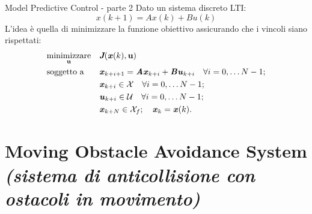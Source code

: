 \documentclass{beamer}
\renewcommand{\vec}[1]{\ensuremath{\boldsymbol{\mathit{#1}}}}
\begin{document}
	\begin{frame}{Model Predictive Control - parte 2}
		Dato un sistema discreto LTI:
		\begin{equation*}
		\label{eqn:MPC_plant_discrete}
		\vec{x}(k+1)=\vec{A}\vec{x}(k)+ \vec{B} \vec{u}(k)
		\end{equation*}
		L'idea è quella di minimizzare la funzione obiettivo assicurando che i vincoli siano rispettati:
		\begin{equation*}
		\label{eqn:MPC_optimization}
		\begin{aligned}
		& \underset{\textbf{u}}{\text{minimizzare}}
		& & {\text{\itshape
				\bfseries J}}(\vec{x}(k), \textbf{u}) \\
		& \text{soggetto a}
		& & \vec{x}_{k+i+1} = \vec{A}\vec{x}_{k+i}+ \vec{B} \vec{u}_{k+i}\quad\forall i=0,\dots N-1;\\
		& & & \vec{x}_{k+i}\in \mathcal{X}\quad\forall i=0,\dots N-1;\\
		& & & \vec{u}_{k+i}\in \mathcal{U}\quad\forall i=0,\dots N-1;\\  
		& & & \vec{x}_{k+N}\in \mathcal{X}_f;\quad\vec{x}_k = \vec{x}(k).
		\end{aligned}
		\end{equation*}
	\end{frame}
	
	\section{Moving Obstacle Avoidance System {\itshape \large (sistema di anticollisione con ostacoli in movimento)}} %
		
\end{document}
